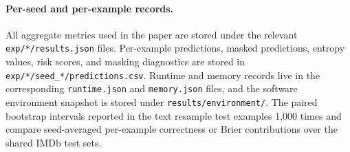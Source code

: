 \documentclass{article}
\begin{document}
\paragraph{Per-seed and per-example records.}
All aggregate metrics used in the paper are stored under the relevant \texttt{exp/*/results.json} files. Per-example predictions, masked predictions, entropy values, risk scores, and masking diagnostics are stored in \texttt{exp/*/seed\_*/predictions.csv}. Runtime and memory records live in the corresponding \texttt{runtime.json} and \texttt{memory.json} files, and the software environment snapshot is stored under \texttt{results/environment/}. The paired bootstrap intervals reported in the text resample test examples 1{,}000 times and compare seed-averaged per-example correctness or Brier contributions over the shared IMDb test sets.



\end{document}
